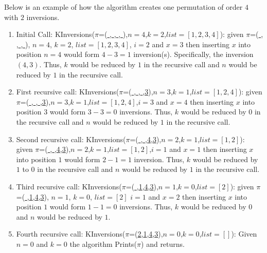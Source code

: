 Below is an example of how the algorithm creates one permutation of order $4$ with $2$ inversions.
\begin{enumerate}
    \item Initial Call: {\sc KInversions}($\pi$=(\underline{ },\underline{ },\underline{ },\underline{ }),$n=4$,$k=2$,$list=[1,2,3,4]$):\newline 
    given $\pi$=(\underline{ },\underline{ },\underline{ },\underline{ }), $n=4$, $k=2$, $list=[1,2,3,4]$, $i=2$ and $x=3$ 
    then inserting $x$ into position $n=4$ would form $4-3=1$ 
    inversion(s). Specifically, the inversion $(4,3)$. Thus, $k$ would be reduced by $1$ in the recursive call 
    and $n$ would be reduced by $1$ in the recursive call. 

    \item First recursive call: {\sc KInversions}($\pi$=(\underline{ },\underline{ },\underline{ },\underline{3}),$n=3$,$k=1$,$list=[1,2,4]$):\newline 
    given $\pi$=(\underline{ },\underline{ },\underline{ },\underline{3}),$n=3$,$k=1$,$list=[1,2,4]$,$i=3$ and $x=4$
    then inserting $x$ into position $3$ would form $3-3=0$ inversions. Thus, $k$ would be reduced by $0$ in the 
    recursive call and $n$ would be reduced by $1$ in the recursive call.

    \item Second recursive call: {\sc KInversions}($\pi$=(\underline{ },\underline{ },\underline{4},\underline{3}),$n=2$,$k=1$,$list=[1,2]$):\newline 
    given $\pi$=(\underline{ },\underline{ },\underline{4},\underline{3}),$n=2$,$k=1$,$list=[1,2]$,$i=1$ and $x=1$
    then inserting $x$ into position $1$ would form $2-1=1$ inversion. Thus, $k$ would be reduced by $1$ to $0$ in the 
    recursive call and $n$ would be reduced by $1$ in the recursive call.

    \item Third recursive call: {\sc KInversions}($\pi$=(\underline{ },\underline{1},\underline{4},\underline{3}),$n=1$,$k=0$,$list=[2]$):
    \newline given $\pi$=(\underline{ },\underline{1},\underline{4},\underline{3}), $n=1$, $k=0$, $list=[2]$ $i=1$ and $x=2$
    then inserting $x$ into position $1$ would form $1-1=0$ inversions. Thus, $k$ would be reduced by $0$
    and $n$ would be reduced by $1$.

    \item Fourth recursive call: {\sc KInversions}($\pi$=(\underline{2},\underline{1},\underline{4},\underline{3}),$n=0$,$k=0$,$list=[]$):\newline 
    Given $n=0$ and $k=0$ the algorithm {\sc Prints}($\pi$) and returns.
\end{enumerate}


